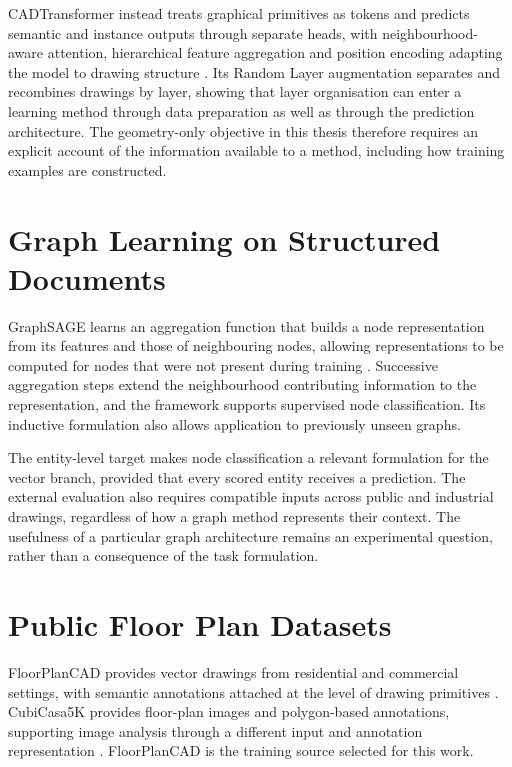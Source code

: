 CADTransformer instead treats graphical primitives as tokens and predicts semantic
and instance outputs through separate heads, with neighbourhood-aware attention,
hierarchical feature aggregation and position encoding adapting the model to
drawing structure \cite{Fan2022CADTransformer}.
Its Random Layer augmentation separates and recombines drawings by layer, showing
that layer organisation can enter a learning method through data preparation as
well as through the prediction architecture.
The geometry-only objective in this thesis therefore requires an explicit account
of the information available to a method, including how training examples are
constructed.

\section{Graph Learning on Structured Documents}
\label{sec:gnn-structured-documents}
GraphSAGE learns an aggregation function that builds a node representation from
its features and those of neighbouring nodes, allowing representations to be
computed for nodes that were not present during training
\cite{Hamilton2017GraphSAGE}.
Successive aggregation steps extend the neighbourhood contributing information to
the representation, and the framework supports supervised node classification.
Its inductive formulation also allows application to previously unseen graphs.

The entity-level target makes node classification a relevant formulation for the
vector branch, provided that every scored entity receives a prediction.
The external evaluation also requires compatible inputs across public and
industrial drawings, regardless of how a graph method represents their context.
The usefulness of a particular graph architecture remains an experimental
question, rather than a consequence of the task formulation.

\section{Public Floor Plan Datasets}
\label{sec:public-datasets-related}
FloorPlanCAD provides vector drawings from residential and commercial settings,
with semantic annotations attached at the level of drawing primitives
\cite{Fan2021FloorPlanCAD}.
CubiCasa5K provides floor-plan images and polygon-based annotations, supporting
image analysis through a different input and annotation representation
\cite{Kalervo2019CubiCasa}.
FloorPlanCAD is the training source selected for this work.

